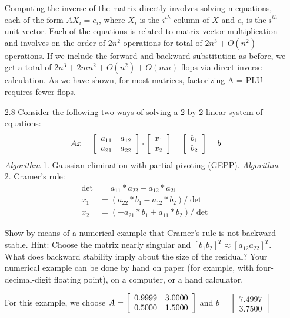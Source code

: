 \documentclass[12pt,letterpaper,reqno]{amsart}
\begin{document}
\begin{enumerate}
\begin{flushleft}
Computing the inverse of the matrix directly involves solving n equations, each of the form $AX_i = e_i$, where $X_i$ is the $i^{th}$ column of $X$ and $e_i$ is the $i^{th}$ unit vector. Each of the equations is related to matrix-vector multiplication and involves on the order of $2n^2$ operations for total of $2n^3 + O(n^2)$ operations. If we include the forward and backward substitution as before, we get a total of $2n^3 + 2mn^2 + O(n^2) + O(mn)$ flops via direct inverse calculation. As we have shown, for most matrices, factorizing A = PLU requires fewer flops.
\end{flushleft}

\newpage
\item[2.8] Consider the following two ways of solving a 2-by-2 linear system of equations:
$$A x = \left[ \begin{array} { l l } { a _ { 11 } } & { a _ { 12 } } \\ { a _ { 21 } } & { a _ { 22 } } \end{array} \right] \cdot \left[ \begin{array} { c } { x _ { 1 } } \\ { x _ { 2 } } \end{array} \right] = \left[ \begin{array} { c } { b _ { 1 } } \\ { b _ { 2 } } \end{array} \right] = b$$
\textit{Algorithm} 1. Gaussian elimination with partial pivoting (GEPP).\newline
\textit{Algorithm} 2. Cramer's rule:
$$
\begin{aligned} \operatorname { det } & = a _ { 11 } * a _ { 22 } - a _ { 12 } * a _ { 21 } \\ x _ { 1 } & = \left( a _ { 22 } * b _ { 1 } - a _ { 12 } * b _ { 2 } \right) / \operatorname { det } \\ x _ { 2 } & = \left( - a _ { 21 } * b _ { 1 } + a _ { 11 } * b _ { 2 } \right) / \operatorname { det } \end{aligned}
$$

Show by means of a numerical example that Cramer's rule is not backward stable. Hint: Choose the matrix nearly singular and $\left[ b _ { 1 } b _ { 2 } \right] ^ { T } \approx \left[ a _ { 12 } a _ { 22 } \right] ^ { T }$. What does backward stability imply about the size of the residual? Your numerical example can be done by hand on paper (for example, with four-decimal-digit floating point), on a computer, or a hand calculator.
\newline
\begin{flushleft}
For this example, we choose
$A = \left[\begin{array} { l l } { 0.9999 } & { 3.0000 } \\ { 0.5000 } & { 1.5000 } \end{array}\right]$ and $b = \left[\begin{array} { l } {7.4997} \\ {3.7500} \end{array}\right]$
\newline


\end{flushleft}
\end{enumerate}
\end{document}
